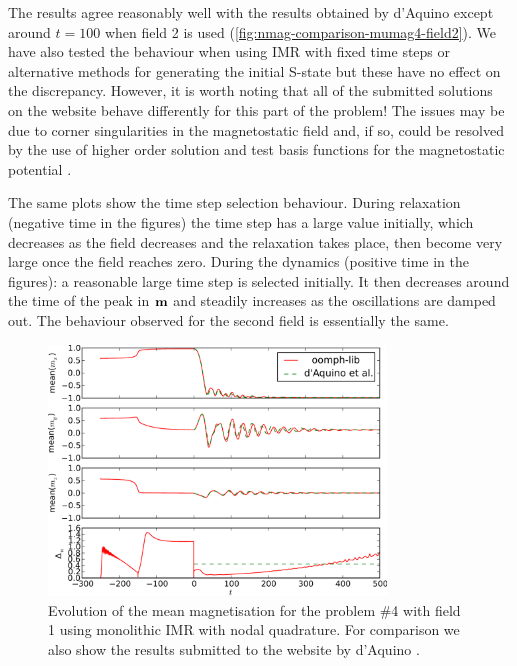 The results agree reasonably well with the results obtained by d'Aquino except around $t=100$ when field 2 is used (\cref{fig:nmag-comparison-mumag4-field2}).
We have also tested the behaviour when using IMR with fixed time steps or alternative methods for generating the initial S-state but these have no effect on the discrepancy.
However, it is worth noting that all of the submitted solutions on the \mumag website \cite{mumag-website} behave differently for this part of the problem!
The issues may be due to corner singularities in the magnetostatic field and, if so, could be resolved by the use of higher order solution and test basis functions for the magnetostatic potential \cite{Schrefl1997}.


The same plots show the time step selection behaviour.
During relaxation (negative time in the figures) the time step has a large value initially, which decreases as the field decreases and the relaxation takes place, then become very large once the field reaches zero.
During the dynamics (positive time in the figures): a reasonable large time step is selected initially.
It then decreases around the time of the peak in $\boldsymbol{\mathrm{m}}$ and steadily increases as the oscillations are damped out.
The behaviour observed for the second field is essentially the same.

\begin{figure}
  \centering
  \includegraphics[width=0.8\textwidth]{plots/mumag4_convergence/mumag4_field1-meanmxsvs-meanmysvs-meanmzsvs-dtsvstimes.pdf}
  \caption{
    Evolution of the mean magnetisation for the \mumag problem \#4 with field 1 using monolithic IMR with nodal quadrature.
    For comparison we also show the results submitted to the \mumag website by d'Aquino \etal \cite{mumag-website}.
}
  \label{fig:nmag-comparison-mumag4-field1}
\end{figure}

